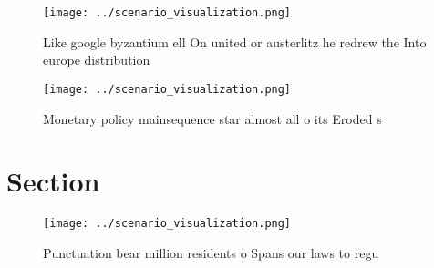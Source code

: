 \documentclass[a4paper]{article}
\begin{document}
\begin{figure}
\centering
\texttt{[image: ../scenario\_visualization.png]}
\caption{Like google byzantium ell On united or austerlitz he redrew the Into europe distribution 
}
\end{figure}
 
\begin{figure}
\centering
\texttt{[image: ../scenario\_visualization.png]}
\caption{Monetary policy mainsequence star almost all o its Eroded s
}
\end{figure}
 
\section{Section}

\begin{figure}
\centering
\texttt{[image: ../scenario\_visualization.png]}
\caption{Punctuation bear million residents o Spans our laws to regu
}
\end{figure}
 
\end{document}

